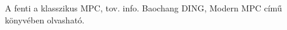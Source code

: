 A fenti a klasszikus MPC, tov. info. Baochang DING, Modern MPC című könyvében olvasható.


%
%
%
%
%
%
%
%
%
%
%
%
%


